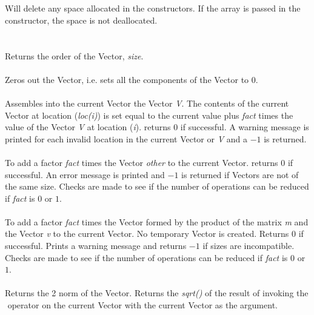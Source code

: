  \\
\\ 
Will delete any space allocated in the constructors. If the array is
passed in the constructor, the space is not deallocated.\\

  \\
 \\
Returns the order of the Vector, {\em size}. \\

 \\
Zeros out the Vector, i.e. sets all the components of the Vector to
$0$. \\

 \\
Assembles into the current Vector the Vector {\em V}. The contents of the
current Vector at location ({\em loc(i)}) is set equal to the current
value plus {\em fact} times the value of the Vector {\em V} at
location ({\em i}). returns $0$ if successful. A warning message is
printed for each invalid location in the current Vector or {\em V} and a
$-1$ is returned. \\ 

 \\
To add a factor {\em fact} times the Vector {\em other} to the current
Vector. returns $0$ if successful. An error message is printed and
$-1$ is returned if Vectors are not of the same size. Checks are made
to see if the number of operations can be reduced if {\em fact} is $0$
or $1$. \\ 

 \\ 
To add a factor {\em fact} times the Vector formed by the product of
the matrix {\em m} and the Vector {\em v} to the current Vector. No
temporary Vector is created. Returns $0$ if successful. Prints a
warning message and returns $-1$ if sizes are incompatible. Checks are
made to see if the number of operations can be reduced if {\em fact}
is $0$ or $1$. \\ 


 \\
Returns the 2 norm of the Vector. Returns the {\em sqrt()} of the
result of invoking the $\hat{ }$ operator on the current Vector with
the current Vector as the argument. \\ 

